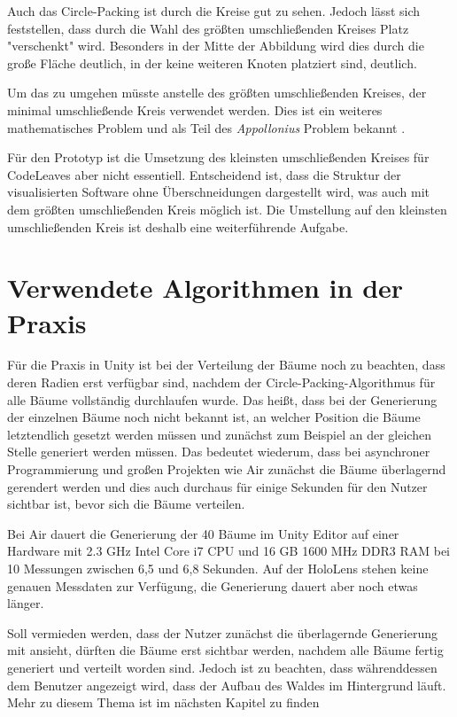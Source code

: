 Auch das Circle-Packing ist durch die Kreise gut zu sehen. Jedoch lässt sich feststellen, dass durch die Wahl des größten umschließenden Kreises Platz "verschenkt" wird. Besonders in der Mitte der Abbildung wird dies durch die große Fläche deutlich, in der keine weiteren Knoten platziert sind, deutlich.

Um das zu umgehen müsste anstelle des größten umschließenden Kreises, der minimal umschließende Kreis verwendet werden. Dies ist ein weiteres mathematisches Problem und als Teil des \textit{Appollonius} Problem bekannt \cite{dergiades2007soddy}.


Für den Prototyp ist die Umsetzung des kleinsten umschließenden Kreises für CodeLeaves aber nicht essentiell. Entscheidend ist, dass die Struktur der visualisierten Software ohne Überschneidungen dargestellt wird, was auch mit dem größten umschließenden Kreis möglich ist. Die Umstellung auf den kleinsten umschließenden Kreis ist deshalb eine weiterführende Aufgabe.

\section{Verwendete Algorithmen in der Praxis}

Für die Praxis in Unity ist bei der Verteilung der Bäume noch zu beachten, dass deren Radien erst verfügbar sind, nachdem der Circle-Packing-Algorithmus für alle Bäume vollständig durchlaufen wurde. Das heißt, dass bei der Generierung der einzelnen Bäume noch nicht bekannt ist, an welcher Position die Bäume letztendlich gesetzt werden müssen und zunächst zum Beispiel an der gleichen Stelle generiert werden müssen. Das bedeutet wiederum, dass bei asynchroner Programmierung und großen Projekten wie Air zunächst die Bäume überlagernd gerendert werden und dies auch durchaus für einige Sekunden für den Nutzer sichtbar ist, bevor sich die Bäume verteilen.

Bei Air dauert die Generierung der 40 Bäume im Unity Editor auf einer Hardware mit 2.3 GHz Intel Core i7 CPU und 16 GB 1600 MHz DDR3 RAM bei 10 Messungen zwischen 6,5 und 6,8 Sekunden. Auf der HoloLens stehen keine genauen Messdaten zur Verfügung, die Generierung dauert aber noch etwas länger.

Soll vermieden werden, dass der Nutzer zunächst die überlagernde Generierung mit ansieht, dürften die Bäume erst sichtbar werden, nachdem alle Bäume fertig generiert und verteilt worden sind. Jedoch ist zu beachten, dass währenddessen dem Benutzer angezeigt wird, dass der Aufbau des Waldes im Hintergrund läuft. Mehr zu diesem Thema ist im nächsten Kapitel zu finden

